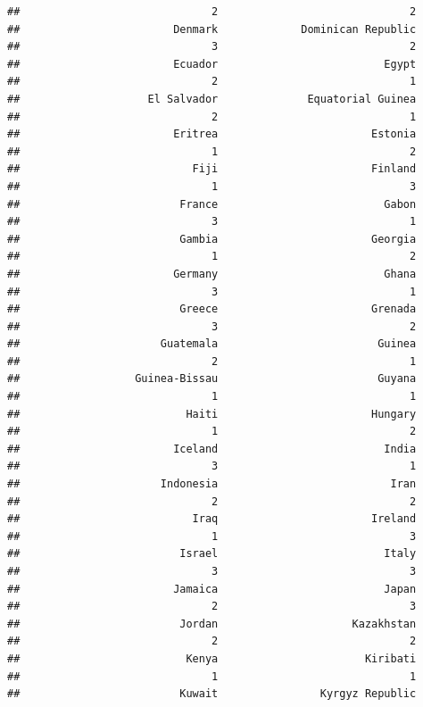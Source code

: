 \documentclass[
]{article}
\begin{document}
\begin{verbatim}
##                              2                              2 
##                        Denmark             Dominican Republic 
##                              3                              2 
##                        Ecuador                          Egypt 
##                              2                              1 
##                    El Salvador              Equatorial Guinea 
##                              2                              1 
##                        Eritrea                        Estonia 
##                              1                              2 
##                           Fiji                        Finland 
##                              1                              3 
##                         France                          Gabon 
##                              3                              1 
##                         Gambia                        Georgia 
##                              1                              2 
##                        Germany                          Ghana 
##                              3                              1 
##                         Greece                        Grenada 
##                              3                              2 
##                      Guatemala                         Guinea 
##                              2                              1 
##                  Guinea-Bissau                         Guyana 
##                              1                              1 
##                          Haiti                        Hungary 
##                              1                              2 
##                        Iceland                          India 
##                              3                              1 
##                      Indonesia                           Iran 
##                              2                              2 
##                           Iraq                        Ireland 
##                              1                              3 
##                         Israel                          Italy 
##                              3                              3 
##                        Jamaica                          Japan 
##                              2                              3 
##                         Jordan                     Kazakhstan 
##                              2                              2 
##                          Kenya                       Kiribati 
##                              1                              1 
##                         Kuwait                Kyrgyz Republic 

\end{verbatim}
\end{document}
